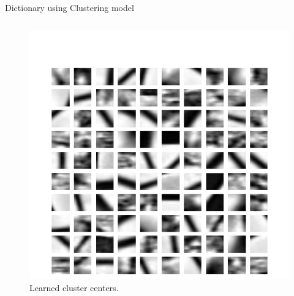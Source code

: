 \documentclass{beamer}
\begin{document}
	\begin{frame}{Dictionary using Clustering model}
			\begin{columns}[c] %
				
					\begin{figure}
						\includegraphics[width=\textwidth]{framework/cluscenters}
						\caption{Learned cluster centers.}
						\label{fig:cluscenters}
					\end{figure}
						

\end{columns}
\end{frame}
\end{document}
